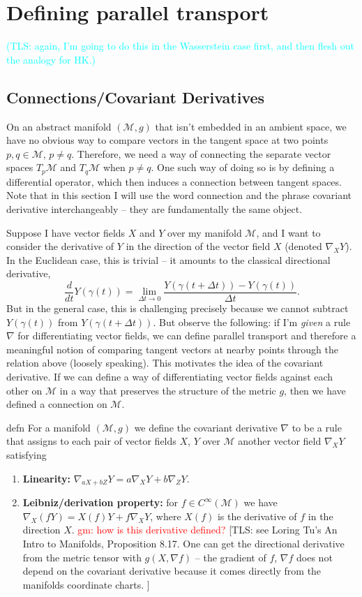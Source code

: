 \documentclass{article}
\newcommand{\man}{\mathcal{M}}
\newcommand{\tls}[1]{{\color{cyan}[TLS: #1]}}
\begin{document}
\section{Defining parallel transport}
\textcolor{cyan}{(TLS: again, I'm going to do this in the Wasserstein case first, and then flesh out the analogy for HK.)}
\subsection{Connections/Covariant Derivatives}
On an abstract manifold $(\man, g)$ that isn't embedded in an ambient space, we have no obvious way to compare vectors in the tangent space at two points $p, q \in \man$, $p \neq q$. Therefore, we need a way of connecting the separate vector spaces $T_p\man$ and $T_q\man$ when $p \neq q$. One such way of doing so is by defining a differential operator, which then induces a connection between tangent spaces. Note that in this section I will use the word connection and the phrase covariant derivative interchangeably -- they are fundamentally the same object.

Suppose I have vector fields $X$ and $Y$ over my manifold $\man$, and I want to consider the derivative of $Y$ in the direction of the vector field $X$ (denoted $\nabla_XY$). In the Euclidean case, this is trivial -- it amounts to the classical directional derivative,
\[\frac{d}{dt}Y(\gamma(t)) = \lim_{\Delta t\rightarrow 0}\frac{Y(\gamma(t + \Delta t)) - Y(\gamma(t))}{\Delta t}.\]
But in the general case, this is challenging precisely because we cannot subtract $Y(\gamma(t ))$ from $Y(\gamma(t + \Delta t))$. But observe the following: if I'm \textit{given} a rule $\nabla$ for differentiating vector fields, we can define parallel transport and therefore a meaningful notion of comparing tangent vectors at nearby points through the relation above (loosely speaking). This motivates the idea of the covariant derivative.
If we can define a way of differentiating vector fields against each other on $\man$ in a way that preserves the structure of the metric $g$, then we have defined a connection on $\man$.

\begin{restatable}{defn}{}
    For a manifold $(\man, g)$ we define the covariant derivative $\nabla$ to be a rule that assigns to each pair of vector fields $X$, $Y$ over $\man$ another vector field $\nabla_XY$ satisfying 
    \begin{enumerate}
        \item \textbf{Linearity:} $\nabla_{aX+bZ}Y = a\nabla_XY + b\nabla_ZY.$
        \item \textbf{Leibniz/derivation property:} for $f \in C^{\infty}(\man)$ we have $\nabla_X(fY) = X(f)Y + f\nabla_XY$, where $X(f)$ is the derivative of $f$ in the direction $X$. \textcolor{red}{gm: how is this derivative defined?} \tls{see Loring Tu's An Intro to Manifolds, Proposition 8.17. One can get the directional derivative from the metric tensor with $g(X, \nabla f)$ -- the gradient of $f$, $\nabla f$ does not depend on the covariant derivative because it comes directly from the manifolds coordinate charts. }
    \end{enumerate}
\end{restatable}
\end{document}
